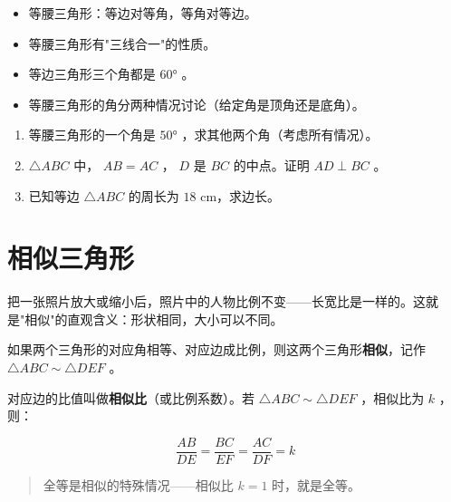 \begin{keytakeaway}


\begin{itemize}
  \item 等腰三角形：等边对等角，等角对等边。
  \item 等腰三角形有"三线合一"的性质。
  \item 等边三角形三个角都是 $60°$ 。
  \item 等腰三角形的角分两种情况讨论（给定角是顶角还是底角）。
\end{itemize}


\end{keytakeaway}

\begin{practice}


\begin{enumerate}
  \item 等腰三角形的一个角是 $50°$ ，求其他两个角（考虑所有情况）。
  \item $\triangle ABC$ 中， $AB = AC$ ， $D$ 是 $BC$ 的中点。证明 $AD \perp BC$ 。
  \item 已知等边 $\triangle ABC$ 的周长为 $18$ cm，求边长。
\end{enumerate}


\end{practice}



\section*{相似三角形}


\begin{explore}


把一张照片放大或缩小后，照片中的人物比例不变——长宽比是一样的。这就是"相似"的直观含义：形状相同，大小可以不同。

\end{explore}

\begin{understand}


如果两个三角形的对应角相等、对应边成比例，则这两个三角形\textbf{相似}，记作 $\triangle ABC \sim \triangle DEF$ 。

对应边的比值叫做\textbf{相似比}（或比例系数）。若 $\triangle ABC \sim \triangle DEF$ ，相似比为 $k$ ，则：

\[
\frac{AB}{DE} = \frac{BC}{EF} = \frac{AC}{DF} = k
\]


\end{understand}

\begin{quote}
全等是相似的特殊情况——相似比 $k = 1$ 时，就是全等。
\end{quote}


